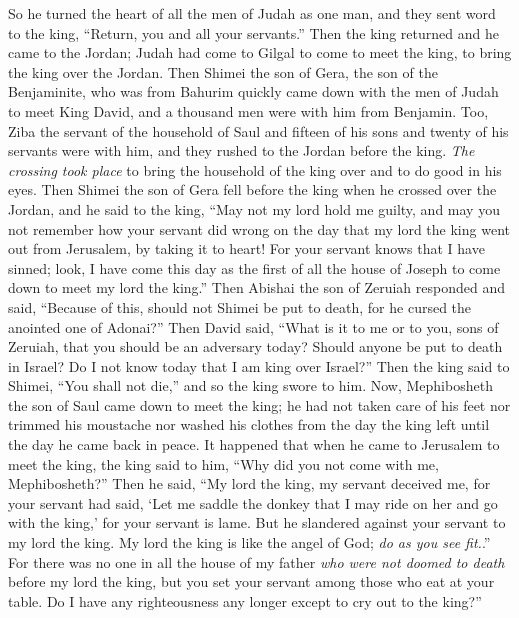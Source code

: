 \begin{biblechapter}
\verse So he turned the heart of all the men of Judah as one man, and they sent word to the king, “Return, you and all your servants.”
\verse Then the king returned and he came to the Jordan; Judah had come to Gilgal to come to meet the king, to bring the king over the Jordan.
\verse Then Shimei the son of Gera, the son of the Benjaminite, who was from Bahurim quickly came down with the men of Judah to meet King David,
\verse and a thousand men were with him from Benjamin. Too, Ziba the servant of the household of Saul and fifteen of his sons and twenty of his servants were with him, and they rushed to the Jordan before the king.
\verse \textit{The crossing took place} to bring the household of the king over and to do good in his eyes. Then Shimei the son of Gera fell before the king when he crossed over the Jordan,
\verse and he said to the king, “May not my lord hold me guilty, and may you not remember how your servant did wrong on the day that my lord the king went out from Jerusalem, by taking it to heart!
\verse For your servant knows that I have sinned; look, I have come this day as the first of all the house of Joseph to come down to meet my lord the king.”
\verse Then Abishai the son of Zeruiah responded and said, “Because of this, should not Shimei be put to death, for he cursed the anointed one of Adonai?”
\verse Then David said, “What is it to me or to you, sons of Zeruiah, that you should be an adversary today? Should anyone be put to death in Israel? Do I not know today that I am king over Israel?”
\verse Then the king said to Shimei, “You shall not die,” and so the king swore to him.
\verse Now, Mephibosheth the son of Saul came down to meet the king; he had not taken care of his feet nor trimmed his moustache nor washed his clothes from the day the king left until the day he came back in peace.
\verse It happened that when he came to Jerusalem to meet the king, the king said to him, “Why did you not come with me, Mephibosheth?”
\verse Then he said, “My lord the king, my servant deceived me, for your servant had said, ‘Let me saddle the donkey that I may ride on her and go with the king,’ for your servant is lame.
\verse But he slandered against your servant to my lord the king. My lord the king is like the angel of God; \textit{do as you see fit.}.”
\verse For there was no one in all the house of my father \textit{who were not doomed to death} before my lord the king, but you set your servant among those who eat at your table. Do I have any righteousness any longer except to cry out to the king?”

\end{biblechapter}
